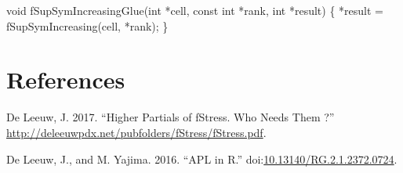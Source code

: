 \documentclass[12pt,]{article}
\newenvironment{Shaded}{\begin{snugshade}}{\end{snugshade}}
\newcommand{\DataTypeTok}[1]{\textcolor[rgb]{0.13,0.29,0.53}{#1}}
\newcommand{\NormalTok}[1]{#1}
\begin{document}
\begin{Shaded}
\begin{Highlighting}[]
\DataTypeTok{void}\NormalTok{ fSupSymIncreasingGlue(}\DataTypeTok{int}\NormalTok{ *cell, }\DataTypeTok{const} \DataTypeTok{int}\NormalTok{ *rank, }\DataTypeTok{int}\NormalTok{ *result) \{}
\NormalTok{    *result = fSupSymIncreasing(cell, *rank);}
\NormalTok{\}}
\end{Highlighting}
\end{Shaded}

\section*{References}\label{references}

\hypertarget{refs}{}
\hypertarget{ref-deleeuw_E_17r}{}
De Leeuw, J. 2017. ``Higher Partials of fStress. Who Needs Them ?''
\url{http://deleeuwpdx.net/pubfolders/fStress/fStress.pdf}.

\hypertarget{ref-deleeuw_yajima_E_16}{}
De Leeuw, J., and M. Yajima. 2016. ``APL in R.''
doi:\href{https://doi.org/10.13140/RG.2.1.2372.0724}{10.13140/RG.2.1.2372.0724}.
\end{document}

